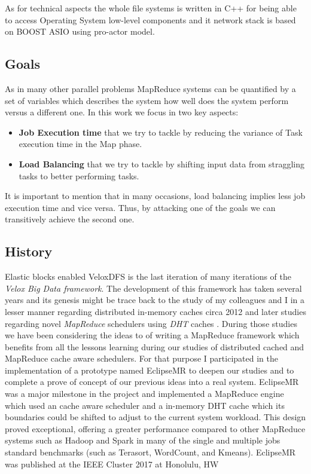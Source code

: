 As for technical aspects the whole file systems is written in C++ for being
able to access Operating System low-level components and it network stack is
based on BOOST ASIO using pro-actor model.

\subsection{Goals} 

As in many other parallel problems MapReduce systems can be quantified by a set of 
variables which describes the system how well does the system perform versus a different one. 
In this work we focus in two key aspects: 

\begin{itemize}
    \item \textbf{Job Execution time} that we try to tackle by reducing the variance of Task execution time in the Map phase.
    \item \textbf{Load Balancing} that we try to tackle by shifting input data from straggling tasks to better performing tasks. 
\end{itemize}

It is important to mention that in many occasions, load balancing implies less job execution time and vice versa. Thus, by attacking one of the goals we can transitively achieve the second one.

\subsection{History}
Elastic blocks enabled VeloxDFS is the last iteration of many iterations of the \textit{Velox Big Data framework}. The development of this framework has taken several years and its genesis might be trace back to the study of my  colleagues and I in a lesser manner regarding distributed in-memory caches circa 2012 \cite{nam2012high} and later studies regarding novel \textit{MapReduce} schedulers using \textit{DHT} caches \cite{eom2015kde}. During those studies we have been considering the ideas to of writing a MapReduce framework which benefits from all the lessons learning during our studies of distributed cached and MapReduce cache aware schedulers. For that purpose I participated in the implementation of a prototype named EclipseMR \cite{sanchez2017eclipsemr} to deepen our studies and to complete a prove of concept of our previous ideas into a real system. EclipseMR was a major milestone in the project and implemented a MapReduce engine which used an cache aware scheduler and a in-memory DHT cache which its boundaries could be shifted to adjust to the current system workload. This design proved exceptional, offering a greater performance compared to other MapReduce systems such as Hadoop and Spark in many of the single and multiple jobs standard benchmarks (such as Terasort, WordCount, and Kmeans). EclipseMR was published at the IEEE Cluster 2017 at Honolulu, HW\cite{sanchez2017eclipsemr}\\

